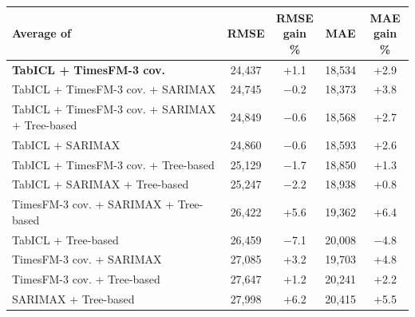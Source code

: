 \setlength{\tabcolsep}{4pt}
\begin{tabular}{lcccc}
\toprule
Average of & RMSE & \shortstack{RMSE\\gain \%} & MAE & \shortstack{MAE\\gain \%} \\
\midrule
\textbf{TabICL + TimesFM-3 cov.} & 24,437 & +1.1 & 18,534 & +2.9 \\
TabICL + TimesFM-3 cov. + SARIMAX & 24,745 & $-$0.2 & 18,373 & +3.8 \\
TabICL + TimesFM-3 cov. + SARIMAX + Tree-based & 24,849 & $-$0.6 & 18,568 & +2.7 \\
TabICL + SARIMAX & 24,860 & $-$0.6 & 18,593 & +2.6 \\
TabICL + TimesFM-3 cov. + Tree-based & 25,129 & $-$1.7 & 18,850 & +1.3 \\
TabICL + SARIMAX + Tree-based & 25,247 & $-$2.2 & 18,938 & +0.8 \\
TimesFM-3 cov. + SARIMAX + Tree-based & 26,422 & +5.6 & 19,362 & +6.4 \\
TabICL + Tree-based & 26,459 & $-$7.1 & 20,008 & $-$4.8 \\
TimesFM-3 cov. + SARIMAX & 27,085 & +3.2 & 19,703 & +4.8 \\
TimesFM-3 cov. + Tree-based & 27,647 & +1.2 & 20,241 & +2.2 \\
SARIMAX + Tree-based & 27,998 & +6.2 & 20,415 & +5.5 \\
\bottomrule
\end{tabular}
